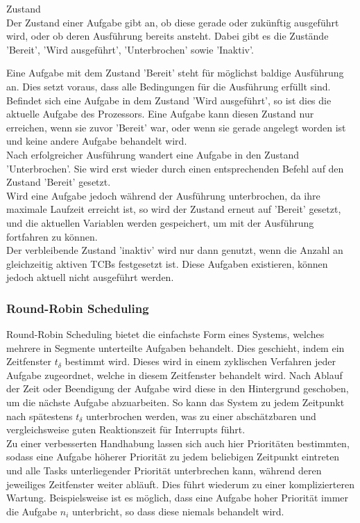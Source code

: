 \begin{definition}{Zustand}\\
Der Zustand einer Aufgabe gibt an, ob diese gerade oder zukünftig ausgeführt wird, oder ob deren Ausführung bereits ansteht. Dabei gibt es die Zustände 'Bereit', 'Wird ausgeführt', 'Unterbrochen' sowie 'Inaktiv'.
\end{definition}
Eine Aufgabe mit dem Zustand 'Bereit' steht für möglichst baldige Ausführung an. Dies setzt voraus, dass alle Bedingungen für die Ausführung erfüllt sind.\\
Befindet sich eine Aufgabe in dem Zustand 'Wird ausgeführt', so ist dies die aktuelle Aufgabe des Prozessors. Eine Aufgabe kann diesen Zustand nur erreichen, wenn sie zuvor 'Bereit' war, oder wenn sie gerade angelegt worden ist und keine andere Aufgabe behandelt wird.\\
Nach erfolgreicher Ausführung wandert eine Aufgabe in den Zustand 'Unterbrochen'. Sie wird erst wieder durch einen entsprechenden Befehl auf den Zustand 'Bereit' gesetzt.\\
Wird eine Aufgabe jedoch während der Ausführung unterbrochen, da ihre maximale Laufzeit erreicht ist, so wird der Zustand erneut auf 'Bereit' gesetzt, und die aktuellen Variablen werden gespeichert, um mit der Ausführung fortfahren zu können.\\
Der verbleibende Zustand 'inaktiv' wird nur dann genutzt, wenn die Anzahl an gleichzeitig aktiven TCBs festgesetzt ist. Diese Aufgaben existieren, können jedoch aktuell nicht ausgeführt werden.

\subsubsection{Round-Robin Scheduling}
Round-Robin Scheduling bietet die einfachste Form eines Systems, welches mehrere in Segmente unterteilte Aufgaben behandelt. Dies geschieht, indem ein Zeitfenster $t_\delta$ bestimmt wird. Dieses wird in einem zyklischen Verfahren jeder Aufgabe zugeordnet, welche in diesem Zeitfenster behandelt wird. Nach Ablauf der Zeit oder Beendigung der Aufgabe wird diese in den Hintergrund geschoben, um die nächste Aufgabe abzuarbeiten. So kann das System zu jedem Zeitpunkt nach spätestens $t_\delta$ unterbrochen werden, was zu einer abschätzbaren und vergleichsweise guten Reaktionszeit für Interrupts führt.\\
Zu einer verbesserten Handhabung lassen sich auch hier Prioritäten bestimmten, sodass eine Aufgabe höherer Priorität zu jedem beliebigen Zeitpunkt eintreten und alle Tasks unterliegender Priorität unterbrechen kann, während deren jeweiliges Zeitfenster weiter abläuft. Dies führt wiederum zu einer komplizierteren Wartung. Beispielsweise ist es möglich, dass eine Aufgabe hoher Priorität immer die Aufgabe $n_i$ unterbricht, so dass diese niemals behandelt wird.

